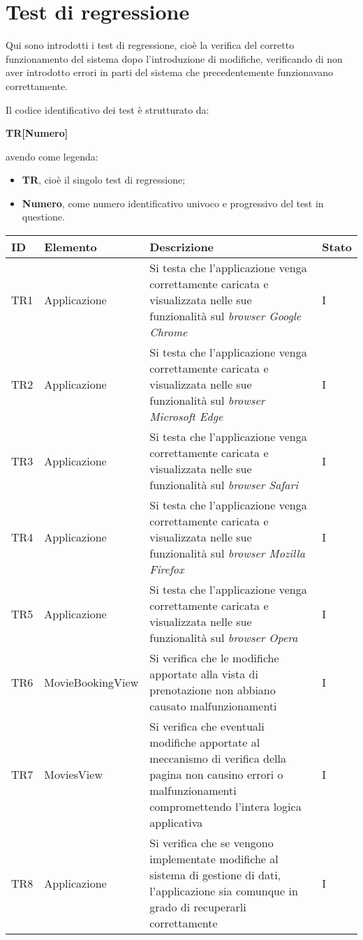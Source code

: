 \clearpage

\section{Test di regressione}\label{sec:verifica-validazione-regressione}

Qui sono introdotti i test di regressione, cioè la verifica del corretto funzionamento del sistema dopo l'introduzione di modifiche, verificando di non aver 
introdotto errori in parti del sistema che precedentemente funzionavano correttamente.

Il codice identificativo dei test è strutturato da:
\begin{center}
    \textbf{TR[Numero]}
  \end{center}
\textbf{}
avendo come legenda:
\begin{itemize}
\item \textbf{TR}, cioè il singolo test di regressione;
\item \textbf{Numero}, come numero identificativo univoco e progressivo del test in questione.
\end{itemize}

\begin{center}
\label{tab:test-regressione}
\begin{longtable}{|C{2.0cm}|C{3.0cm}|C{8.0cm}|C{2.0cm}|}
\hline
\textbf{ID} & \textbf{Elemento} & \textbf{Descrizione} & \textbf{Stato} \\
\hline
TR1 & Applicazione & Si testa che l'applicazione venga correttamente caricata e visualizzata nelle sue funzionalità sul \textit{browser Google Chrome} & I \\
\hline
TR2 & Applicazione & Si testa che l'applicazione venga correttamente caricata e visualizzata nelle sue funzionalità sul \textit{browser Microsoft Edge} & I \\
\hline
TR3 & Applicazione & Si testa che l'applicazione venga correttamente caricata e visualizzata nelle sue funzionalità sul \textit{browser Safari} & I \\
\hline
TR4 & Applicazione & Si testa che l'applicazione venga correttamente caricata e visualizzata nelle sue funzionalità sul \textit{browser Mozilla Firefox} & I \\
\hline
TR5 & Applicazione & Si testa che l'applicazione venga correttamente caricata e visualizzata nelle sue funzionalità sul \textit{browser Opera} & I \\
\hline
TR6 & MovieBookingView & Si verifica che le modifiche apportate alla vista di prenotazione non abbiano causato malfunzionamenti & I \\
\hline
TR7 & MoviesView & Si verifica che eventuali modifiche apportate al meccanismo di verifica della pagina non causino errori o malfunzionamenti compromettendo l'intera logica applicativa & I \\
\hline
TR8 & Applicazione & Si verifica che se vengono implementate modifiche al sistema di gestione di dati, l'applicazione sia comunque in grado di recuperarli correttamente & I \\
\hline
\end{longtable}
\end{center}

